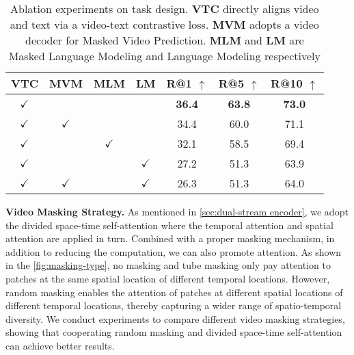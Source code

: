 \documentclass[10pt,twocolumn,letterpaper]{article}
\begin{document}
\begin{table}[h]
\centering
\small
\begin{tabular}{@{}cccc|ccc@{}}
\toprule
\textbf{VTC}  &  \textbf{MVM} & \textbf{MLM} & \textbf{LM} &  \textbf{R@1} $\uparrow$  & \textbf{R@5} $\uparrow$   & \textbf{R@10}  $\uparrow$   \\ \midrule
$\checkmark$ &                  &      &             & \textbf{36.4}      & \textbf{63.8}      & \textbf{73.0}    \\
$\checkmark$ & $\checkmark$     &      &          & 34.4  & 60.0  & 71.1         \\
$\checkmark$  &    &   $\checkmark$  &           &32.1 &  58.5 &  69.4         \\
$\checkmark$  &    &     &      $\checkmark$     &27.2 &  51.3 &  63.9         \\
$\checkmark$ & $\checkmark$ &    &  $\checkmark$   &26.3 &  51.3 & 64.0      \\ \bottomrule
\end{tabular}
\caption{Ablation experiments on task design. \textbf{VTC} directly aligns video and text via a video-text contrastive loss. \textbf{MVM} adopts a video decoder for Masked Video Prediction. \textbf{MLM} and \textbf{LM} are Masked Language Modeling and Language Modeling respectively }
\label{tab:task-ablations}
\end{table}

\vspace{1mm}\noindent\textbf{Video Masking Strategy.} As mentioned in \cref{sec:dual-stream encoder}, we adopt the divided space-time self-attention where the temporal attention and spatial attention are applied in turn. Combined with a proper masking mechanism, in addition to reducing the computation, we can also promote attention. As shown in the \cref{fig:masking-type}, no masking and tube masking only pay attention to patches at the same spatial location of different temporal locations. However, random masking enables the attention of patches at different spatial locations of different temporal locations, thereby capturing a wider range of spatio-temporal diversity. We conduct experiments to compare different video masking strategies, showing that cooperating random masking and divided space-time self-attention can achieve better results.
\end{document}
